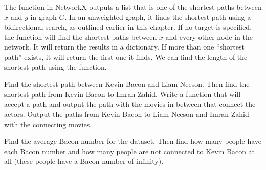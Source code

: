 The  function in NetworkX outputs a list that is one of the shortest paths between $x$ and $y$ in graph $G$.  In an unweighted graph, it finds the shortest path using a bidirectional search, as outlined earlier in this chapter. If no target is specified, the function will find the shortest paths between $x$ and every other node in the network.  It will return the results in a dictionary.  If more than one ``shortest path'' exists, it will return the first one it finds.  We can find the length of the shortest path using the  function.

\begin{problem}
Find the shortest path between Kevin Bacon and Liam Neeson. Then find the shortest path from Kevin Bacon to Imran Zahid. Write a function that will accept a path and output the path with the movies in between that connect the actors. Output the paths from Kevin Bacon to Liam Neeson and Imran Zahid with the connecting movies.
\end{problem}

\begin{problem}
Find the average Bacon number for the dataset. Then find how many people have each Bacon number and how many people are not connected to Kevin Bacon at all (these people have a Bacon number of infinity).
\end{problem}

